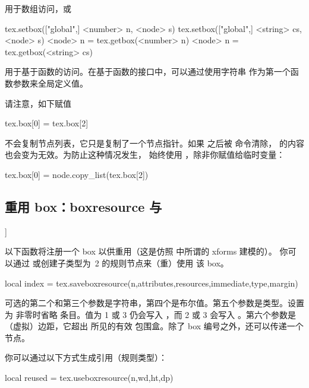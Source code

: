 用于数组访问，或

\begin{typing}
tex.setbox(["global",] <number> n, <node> s)
tex.setbox(["global",] <string> cs, <node> s)
<node> n = tex.getbox(<number> n)
<node> n = tex.getbox(<string> cs)
\end{typing}

用于基于函数的访问。在基于函数的接口中，可以通过使用字符串 
作为第一个函数参数来全局定义值。

请注意，如下赋值

\begin{typing}
tex.box[0] = tex.box[2]
\end{typing}

不会复制节点列表，它只是复制了一个节点指针。如果  之后被
\TEX 命令清除， 的内容也会变为无效。为防止这种情况发生，
始终使用 ，除非你赋值给临时变量：

\begin{typing}
tex.box[0] = node.copy_list(tex.box[2])
\end{typing}

\subsection{{重用 box：\type {[use|save}boxresource} 与 }]



以下函数将注册一个 box 以供重用（这是仿照 \PDF 中所谓的 xforms 建模的）。
你可以通过  或创建子类型为~2 的规则节点来（重）使用
该 box。

\begin{typing}
local index = tex.saveboxresource(n,attributes,resources,immediate,type,margin)
\end{typing}

可选的第二个和第三个参数是字符串，第四个是布尔值。第五个参数是类型。设置为
非零时省略  条目。值为 1 或 3 仍会写入 ，而 2 或 3
会写入 。第六个参数是（虚拟）边距，它超出 \TEX 所见的有效
包围盒。除了 box 编号之外，还可以传递一个  节点。

你可以通过以下方式生成引用（规则类型）：

\begin{typing}
local reused = tex.useboxresource(n,wd,ht,dp)
\end{typing}

